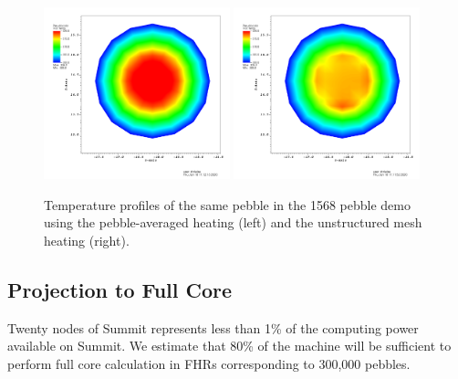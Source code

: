 \begin{figure}[!h]
\centering
\includegraphics[clip=true,width=0.48\textwidth]{Figures/openmc_cell_temperature_zoomed}
\includegraphics[clip=true,width=0.48\textwidth]{Figures/openmc_mesh_temperature_zoomed}
\caption{Temperature profiles of the same pebble in the 1568 pebble demo using the pebble-averaged heating (left) and the unstructured mesh heating (right).}
\label{f:1568_openmc_temperatures_single_pebble}
\end{figure}

\subsection{Projection to Full Core}

Twenty nodes of Summit represents less than 1\% of the computing power available on Summit. We estimate that 80\% of the machine will be sufficient to perform full core calculation in FHRs corresponding to 300,000 pebbles.
